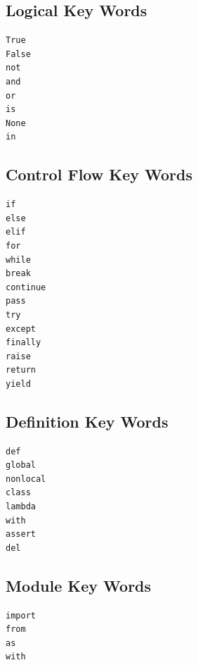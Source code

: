 \documentclass{book}
\begin{document}
    
        \subsection{Logical Key Words}\label{logical-key-words}
    




    
        \begin{lstlisting}
True
False
not
and
or
is
None
in
\end{lstlisting}
    




    
        \subsection{Control Flow Key Words}\label{control-flow-key-words}
    




    
        \begin{lstlisting}
if
else
elif
for
while
break
continue
pass
try
except
finally
raise
return
yield
\end{lstlisting}
    




    
        \subsection{Definition Key Words}\label{definition-key-words}
    




    
        \begin{lstlisting}
def
global
nonlocal
class
lambda
with
assert
del
\end{lstlisting}
    




    
        \subsection{Module Key Words}\label{module-key-words}
    




    
        \begin{lstlisting}
import
from
as
with
\end{lstlisting}
    
\end{document}

